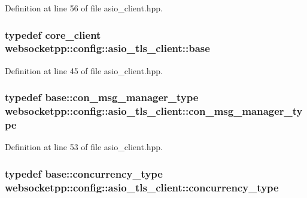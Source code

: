 Definition at line 56 of file asio\+\_\+client.\+hpp.

\hypertarget{structwebsocketpp_1_1config_1_1asio__tls__client_ac352cb7bbd677155ad5329e7b419013f}{}
\subsubsection[{base}]{\setlength{\rightskip}{0pt plus 5cm}typedef {\bf core\+\_\+client} {\bf websocketpp\+::config\+::asio\+\_\+tls\+\_\+client\+::base}}\label{structwebsocketpp_1_1config_1_1asio__tls__client_ac352cb7bbd677155ad5329e7b419013f}


Definition at line 45 of file asio\+\_\+client.\+hpp.

\hypertarget{structwebsocketpp_1_1config_1_1asio__tls__client_aa7263bd0b6da524cf12652b236bcdf74}{}
\subsubsection[{con\+\_\+msg\+\_\+manager\+\_\+type}]{\setlength{\rightskip}{0pt plus 5cm}typedef {\bf base\+::con\+\_\+msg\+\_\+manager\+\_\+type} {\bf websocketpp\+::config\+::asio\+\_\+tls\+\_\+client\+::con\+\_\+msg\+\_\+manager\+\_\+type}}\label{structwebsocketpp_1_1config_1_1asio__tls__client_aa7263bd0b6da524cf12652b236bcdf74}


Definition at line 53 of file asio\+\_\+client.\+hpp.

\hypertarget{structwebsocketpp_1_1config_1_1asio__tls__client_afd8b2322960ee1c93994d6a7a344fb4b}{}
\subsubsection[{concurrency\+\_\+type}]{\setlength{\rightskip}{0pt plus 5cm}typedef {\bf base\+::concurrency\+\_\+type} {\bf websocketpp\+::config\+::asio\+\_\+tls\+\_\+client\+::concurrency\+\_\+type}}\label{structwebsocketpp_1_1config_1_1asio__tls__client_afd8b2322960ee1c93994d6a7a344fb4b}


